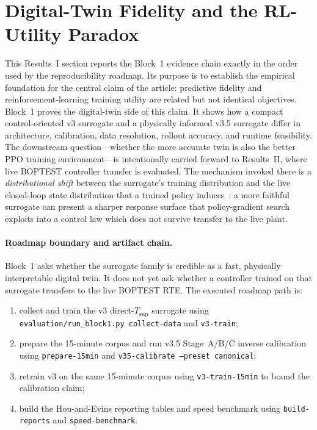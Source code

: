 \documentclass[11pt,a4paper]{article}
\newcommand{\Tsupply}{\ensuremath{T_{\mathrm{sup}}}}
\begin{document}
\setcounter{section}{3}
\section{Digital-Twin Fidelity and the RL-Utility Paradox}
\label{sec:results1-digital-twin}

This Results~I section reports the Block~1 evidence chain exactly in the order used by the reproducibility roadmap. Its purpose is to establish the empirical foundation for the central claim of the article: predictive fidelity and reinforcement-learning training utility are related but not identical objectives. Block~1 proves the digital-twin side of this claim. It shows how a compact control-oriented v3 surrogate and a physically informed v3.5 surrogate differ in architecture, calibration, data resolution, rollout accuracy, and runtime feasibility. The downstream question---whether the more accurate twin is also the better PPO training environment---is intentionally carried forward to Results~II, where live BOPTEST controller transfer is evaluated. The mechanism invoked there is a \emph{distributional shift} between the surrogate's training distribution and the live closed-loop state distribution that a trained policy induces~\citep{RiahiSamani2026OOD,Quinonero2009DatasetShift}: a more faithful surrogate can present a sharper response surface that policy-gradient search exploits into a control law which does not survive transfer to the live plant.

\paragraph{Roadmap boundary and artifact chain.}
\label{ssec:block1-roadmap-boundary}

Block~1 asks whether the surrogate family is credible as a fast, physically interpretable digital twin. It does not yet ask whether a controller trained on that surrogate transfers to the live BOPTEST RTE. The executed roadmap path is:
\begin{enumerate}
  \item collect and train the v3 direct-\Tsupply{} surrogate using \texttt{evaluation/run\_block1.py collect-data} and \texttt{v3-train};
  \item prepare the 15-minute corpus and run v3.5 Stage~A/B/C inverse calibration using \texttt{prepare-15min} and \texttt{v35-calibrate --preset canonical};
  \item retrain v3 on the same 15-minute corpus using \texttt{v3-train-15min} to bound the calibration claim;
  \item build the Hou-and-Evins reporting tables and speed benchmark using \texttt{build-reports} and \texttt{speed-benchmark}.
\end{enumerate}
\end{document}

